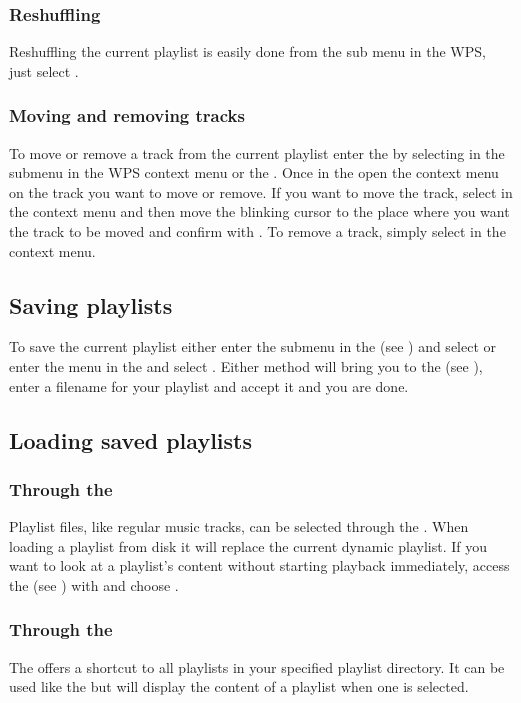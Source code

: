 \subsubsection{Reshuffling}
Reshuffling the current playlist is easily done from the 
sub menu in the WPS, just select .

\subsubsection{Moving and removing tracks}
To move or remove a track from the current playlist enter the
 by selecting  in the
 submenu in the WPS context menu or the .
Once in the  open the context menu on the track you
want to move or remove. If you want to move the track, select  in
the context menu and then move the blinking cursor to the place where you want
the track to be moved and confirm with \ActionStdOk. To remove a track, simply
select  in the context menu.

\subsection{Saving playlists}
To save the current playlist either enter the  submenu
in the  (see ) and
select  or enter the
 menu in the  and select
.
Either method will bring you to the  (see
), enter a filename for your playlist and
accept it and you are done.

\subsection{Loading saved playlists}
\subsubsection{Through the }
Playlist files, like regular music tracks, can be selected through the
. When loading a playlist from disk it will replace
the current dynamic playlist. If you want to look at a playlist's
content without starting playback immediately, access the  (see
) with \ActionStdContext{} and choose .

\subsubsection{Through the }
The  offers a shortcut to all playlists in your
\daps{} specified playlist directory.
It can be used like the  but will display
the content of a playlist when one is selected.

